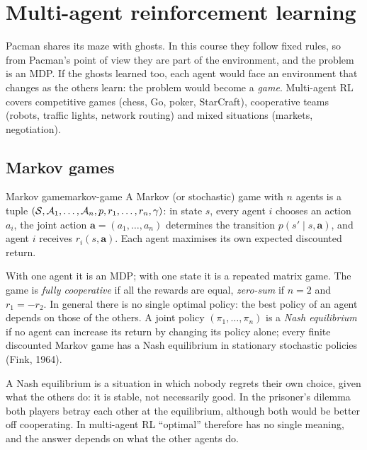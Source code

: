 \chapter{Multi-agent reinforcement learning}
\label{ch:multiagent}

Pacman shares its maze with ghosts. In this course they follow fixed rules,
so from Pacman's point of view they are part of the environment, and the
problem is an MDP. If the ghosts learned too, each agent would face an
environment that changes as the others learn: the problem would become a
\emph{game}. Multi-agent RL covers competitive games (chess, Go, poker,
StarCraft), cooperative teams (robots, traffic lights, network routing)
and mixed situations (markets, negotiation).

\section{Markov games}

\begin{definition}{Markov game}{markov-game}
  A Markov (or stochastic) game with $n$ agents is a tuple $(\mathcal{S},
  \mathcal{A}_1, \dots, \mathcal{A}_n, p, r_1, \dots, r_n, \gamma)$: in state $s$,
  every agent $i$ chooses an action $a_i$, the joint action $\mathbf{a} =
  (a_1, \dots, a_n)$ determines the transition $p(s' \mid s, \mathbf{a})$,
  and agent $i$ receives $r_i(s, \mathbf{a})$. Each agent maximises its own
  expected discounted return.
\end{definition}

With one agent it is an MDP; with one state it is a repeated matrix game.
The game is \emph{fully cooperative} if all the rewards are equal,
\emph{zero-sum} if $n = 2$ and $r_1 = -r_2$. In general there is no single
optimal policy: the best policy of an agent depends on those of the others.
A joint policy $(\pi_1, \dots, \pi_n)$ is a \emph{Nash equilibrium} if no
agent can increase its return by changing its policy alone; every finite
discounted Markov game has a Nash equilibrium in stationary stochastic
policies (Fink, 1964).

\begin{intuition}
  A Nash equilibrium is a situation in which nobody regrets their own
  choice, given what the others do: it is stable, not necessarily good. In
  the prisoner's dilemma both players betray each other at the
  equilibrium, although both would be better off cooperating. In
  multi-agent RL ``optimal'' therefore has no single meaning, and the
  answer depends on what the other agents do.
\end{intuition}

